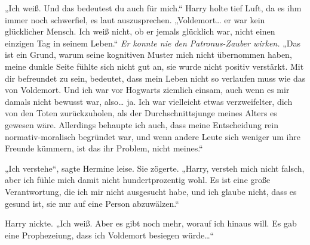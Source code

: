„Ich weiß. Und das bedeutest du auch für mich.“
Harry holte tief Luft, da es ihm immer noch schwerfiel, es laut auszusprechen.
„Voldemort… er war kein glücklicher Mensch. Ich weiß nicht, ob er jemals glücklich war, nicht einen einzigen Tag in seinem Leben.“
\emph{Er konnte nie den Patronus-Zauber wirken.}
„Das ist ein Grund, warum seine kognitiven Muster mich nicht übernommen haben, meine dunkle Seite fühlte sich nicht gut an, sie wurde nicht positiv verstärkt. Mit dir befreundet zu sein, bedeutet, dass mein Leben nicht so verlaufen muss wie das von Voldemort. Und ich war vor Hogwarts ziemlich einsam, auch wenn es mir damals nicht bewusst war, also… ja. Ich war vielleicht etwas verzweifelter, dich von den Toten zurückzuholen, als der Durchschnittsjunge meines Alters es gewesen wäre. Allerdings behaupte ich auch, dass meine Entscheidung rein normativ-moralisch begründet war, und wenn andere Leute sich weniger um ihre Freunde kümmern, ist das ihr Problem, nicht meines.“

„Ich verstehe“, sagte Hermine leise. Sie zögerte. „Harry, versteh mich nicht falsch, aber ich fühle mich damit nicht hundertprozentig wohl. Es ist eine große Verantwortung, die ich mir nicht ausgesucht habe, und ich glaube nicht, dass es gesund ist, sie nur auf eine Person abzuwälzen.“

Harry nickte.
„Ich weiß. Aber es gibt noch mehr, worauf ich hinaus will. Es gab eine Prophezeiung, dass ich Voldemort besiegen würde…“

